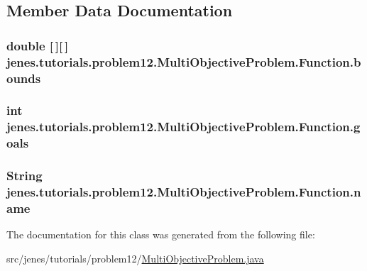 \subsection{Member Data Documentation}
\hypertarget{classjenes_1_1tutorials_1_1problem12_1_1_multi_objective_problem_1_1_function_a967f81c2f3f08aaf45ea8a9cea350a6a}{
\subsubsection[{bounds}]{\setlength{\rightskip}{0pt plus 5cm}double \mbox{[}$\,$\mbox{]}\mbox{[}$\,$\mbox{]} jenes.\-tutorials.\-problem12.\-Multi\-Objective\-Problem.\-Function.\-bounds\hspace{0.3cm}{\ttfamily [protected]}}}\label{classjenes_1_1tutorials_1_1problem12_1_1_multi_objective_problem_1_1_function_a967f81c2f3f08aaf45ea8a9cea350a6a}
\hypertarget{classjenes_1_1tutorials_1_1problem12_1_1_multi_objective_problem_1_1_function_a0407f39b5b8f36b8db33a72d46561cf8}{
\subsubsection[{goals}]{\setlength{\rightskip}{0pt plus 5cm}int jenes.\-tutorials.\-problem12.\-Multi\-Objective\-Problem.\-Function.\-goals\hspace{0.3cm}{\ttfamily [protected]}}}\label{classjenes_1_1tutorials_1_1problem12_1_1_multi_objective_problem_1_1_function_a0407f39b5b8f36b8db33a72d46561cf8}
\hypertarget{classjenes_1_1tutorials_1_1problem12_1_1_multi_objective_problem_1_1_function_aa6ba25bb3bdfd596b9acf04e242dd8b9}{
\subsubsection[{name}]{\setlength{\rightskip}{0pt plus 5cm}String jenes.\-tutorials.\-problem12.\-Multi\-Objective\-Problem.\-Function.\-name\hspace{0.3cm}{\ttfamily [protected]}}}\label{classjenes_1_1tutorials_1_1problem12_1_1_multi_objective_problem_1_1_function_aa6ba25bb3bdfd596b9acf04e242dd8b9}


The documentation for this class was generated from the following file\-:\begin{DoxyCompactItemize}
\item 
src/jenes/tutorials/problem12/\hyperlink{problem12_2_multi_objective_problem_8java}{Multi\-Objective\-Problem.\-java}\end{DoxyCompactItemize}

